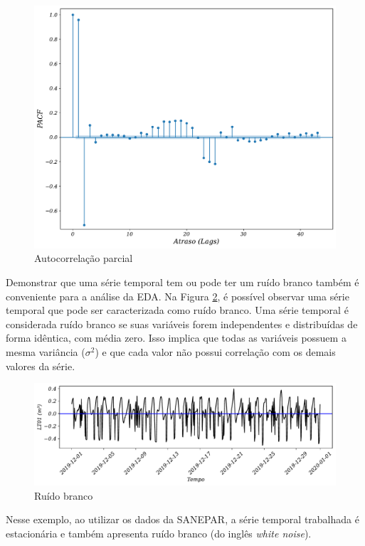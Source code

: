 \begin{figure}[!htb]
	\centering
	\caption{Autocorrelação parcial}\label{fig:pacf}
	\includegraphics[width=0.7\linewidth]{Resultados/Figuras/pacf}
	
	
	
\end{figure}



Demonstrar que uma série temporal tem ou pode ter um ruído branco também é conveniente para a análise da EDA.
Na Figura \ref{fig:ruido-branco}, é possível observar uma série temporal que pode ser caracterizada como ruído branco. Uma série temporal é considerada ruído branco se suas variáveis forem independentes e distribuídas de forma idêntica, com média zero. Isso implica que todas as variáveis possuem a mesma variância ($\sigma^2$) e que cada valor não possui correlação com os demais valores da série.

\begin{figure}[!htb]
	\centering
	\caption{Ruído branco}
	\label{fig:ruido-branco}
	\includegraphics[width=\linewidth]{Resultados/Figuras/ruido-branco}
	
	
\end{figure}

Nesse exemplo, ao utilizar os dados da SANEPAR, a série temporal trabalhada é estacionária e também apresenta ruído branco (do inglês \textit{white noise}).



